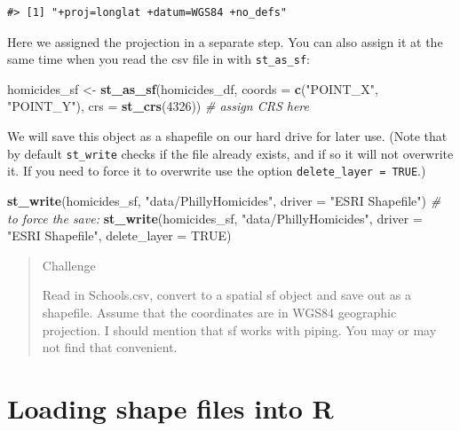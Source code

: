 \documentclass[
]{book}
\newenvironment{Shaded}{\begin{snugshade}}{\end{snugshade}}
\newcommand{\AttributeTok}[1]{\textcolor[rgb]{0.13,0.29,0.53}{#1}}
\newcommand{\CommentTok}[1]{\textcolor[rgb]{0.56,0.35,0.01}{\textit{#1}}}
\newcommand{\ConstantTok}[1]{\textcolor[rgb]{0.56,0.35,0.01}{#1}}
\newcommand{\DecValTok}[1]{\textcolor[rgb]{0.00,0.00,0.81}{#1}}
\newcommand{\FunctionTok}[1]{\textcolor[rgb]{0.13,0.29,0.53}{\textbf{#1}}}
\newcommand{\NormalTok}[1]{#1}
\newcommand{\OtherTok}[1]{\textcolor[rgb]{0.56,0.35,0.01}{#1}}
\newcommand{\StringTok}[1]{\textcolor[rgb]{0.31,0.60,0.02}{#1}}
\begin{document}
\begin{verbatim}
#> [1] "+proj=longlat +datum=WGS84 +no_defs"
\end{verbatim}

Here we assigned the projection in a separate step. You can also assign it at the same time when you read the csv file in with \texttt{st\_as\_sf}:

\begin{Shaded}
\begin{Highlighting}[]
\NormalTok{homicides\_sf }\OtherTok{\textless{}{-}} \FunctionTok{st\_as\_sf}\NormalTok{(homicides\_df, }\AttributeTok{coords =} \FunctionTok{c}\NormalTok{(}\StringTok{"POINT\_X"}\NormalTok{, }\StringTok{"POINT\_Y"}\NormalTok{), }
                         \AttributeTok{crs =} \FunctionTok{st\_crs}\NormalTok{(}\DecValTok{4326}\NormalTok{)) }\CommentTok{\# assign CRS here}
\end{Highlighting}
\end{Shaded}

We will save this object as a shapefile on our hard drive for later use. (Note that by default \texttt{st\_write} checks if the file already exists, and if so it will not overwrite it. If you need to force it to overwrite use the option \texttt{delete\_layer\ =\ TRUE}.)

\begin{Shaded}
\begin{Highlighting}[]
\FunctionTok{st\_write}\NormalTok{(homicides\_sf, }\StringTok{"data/PhillyHomicides"}\NormalTok{, }\AttributeTok{driver =} \StringTok{"ESRI Shapefile"}\NormalTok{)}
\CommentTok{\# to force the save: }
\FunctionTok{st\_write}\NormalTok{(homicides\_sf, }\StringTok{"data/PhillyHomicides"}\NormalTok{, }\AttributeTok{driver =} \StringTok{"ESRI Shapefile"}\NormalTok{, }\AttributeTok{delete\_layer =} \ConstantTok{TRUE}\NormalTok{)}
\end{Highlighting}
\end{Shaded}

\begin{quote}
Challenge

Read in Schools.csv, convert to a spatial sf object and save out as a shapefile. Assume that the coordinates are in WGS84 geographic projection.
I should mention that sf works with piping. You may or may not find that convenient.
\end{quote}

\section{Loading shape files into R}\label{loading-shape-files-into-r}
\end{document}
